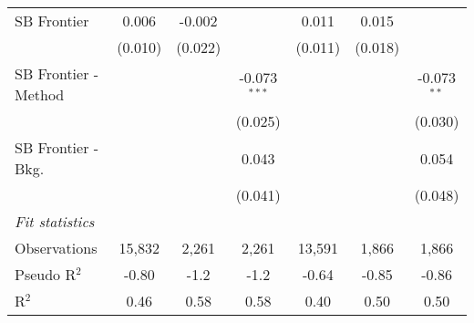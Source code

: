 \begin{tabular}{lcccccc}
   SB Frontier          & 0.006       & -0.002  &                & 0.011        & 0.015   &   \\   
                        & (0.010)     & (0.022) &                & (0.011)      & (0.018) &   \\   
   SB Frontier - Method &             &         & -0.073$^{***}$ &              &         & -0.073$^{**}$\\   
                        &             &         & (0.025)        &              &         & (0.030)\\   
   SB Frontier - Bkg.   &             &         & 0.043          &              &         & 0.054\\   
                        &             &         & (0.041)        &              &         & (0.048)\\   
   \midrule
   \emph{Fit statistics}\\
   Observations         & 15,832      & 2,261   & 2,261          & 13,591       & 1,866   & 1,866\\  
   Pseudo R$^2$         & -0.80       & -1.2    & -1.2           & -0.64        & -0.85   & -0.86\\  
   R$^2$                & 0.46        & 0.58    & 0.58           & 0.40         & 0.50    & 0.50\\  
   

\end{tabular}
